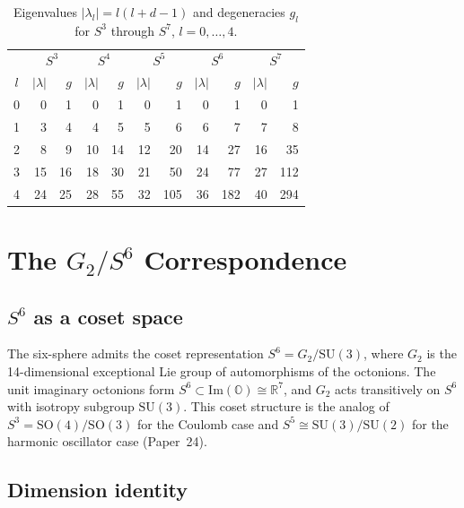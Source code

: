 \documentclass[twocolumn,pra,amsmath,amssymb,superscriptaddress]{revtex4-2}
\begin{document}
\begin{table}
\caption{Eigenvalues $|\lambda_l| = l(l+d-1)$ and degeneracies
$g_l$ for $S^3$ through $S^7$, $l = 0, \ldots, 4$.
\label{tab:numerical}}
\begin{ruledtabular}
\begin{tabular}{c|rr|rr|rr|rr|rr}
 & \multicolumn{2}{c|}{$S^3$} & \multicolumn{2}{c|}{$S^4$}
 & \multicolumn{2}{c|}{$S^5$} & \multicolumn{2}{c|}{$S^6$}
 & \multicolumn{2}{c}{$S^7$} \\
$l$ & $|\lambda|$ & $g$ & $|\lambda|$ & $g$
    & $|\lambda|$ & $g$ & $|\lambda|$ & $g$
    & $|\lambda|$ & $g$ \\
\hline
0 &  0 &  1 &  0 &  1 &  0 &  1 &  0 &   1 &  0 &   1 \\
1 &  3 &  4 &  4 &  5 &  5 &  6 &  6 &   7 &  7 &   8 \\
2 &  8 &  9 & 10 & 14 & 12 & 20 & 14 &  27 & 16 &  35 \\
3 & 15 & 16 & 18 & 30 & 21 & 50 & 24 &  77 & 27 & 112 \\
4 & 24 & 25 & 28 & 55 & 32 &105 & 36 & 182 & 40 & 294 \\
\end{tabular}
\end{ruledtabular}
\end{table}


\section{The $G_2/S^6$ Correspondence}
\label{sec:g2}

\subsection{$S^6$ as a coset space}

The six-sphere admits the coset representation
$S^6 = G_2/\mathrm{SU}(3)$, where $G_2$ is the 14-dimensional
exceptional Lie group of automorphisms of the octonions.
The unit imaginary octonions form $S^6 \subset \mathrm{Im}(\mathbb{O})
\cong \mathbb{R}^7$, and $G_2$ acts transitively on $S^6$ with
isotropy subgroup $\mathrm{SU}(3)$.  This coset structure is
the analog of $S^3 = \mathrm{SO}(4)/\mathrm{SO}(3)$ for the
Coulomb case and $S^5 \cong \mathrm{SU}(3)/\mathrm{SU}(2)$ for
the harmonic oscillator case (Paper~24).

\subsection{Dimension identity}
\end{document}
